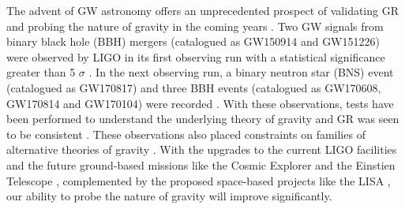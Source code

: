      


The advent of GW astronomy offers an unprecedented prospect of validating GR and probing the nature of gravity in the coming years \cite{kipGWGR}. Two GW signals from binary black hole (BBH) mergers (catalogued as GW150914 and GW151226) were observed by LIGO in its first observing run with a statistical significance greater than 5 $\sigma$ \cite{TheLIGOScientific:2016pea}. In the next observing run, a binary neutron star (BNS) event (catalogued as GW170817) and three BBH events (catalogued as GW170608, GW170814 and GW170104) were recorded \cite{GW170608, GW170814,GW170104, GW170817}. With these observations, tests have been performed to understand the underlying theory of gravity and GR was seen to be consistent \cite{TheLIGOScientific:2016src}. These observations also placed constraints on families of alternative theories of gravity  \cite{Yunes:2016jcc,TheLIGOScientific:2016src,2016arXiv160308955Y}. With the upgrades to the current LIGO facilities \cite{2015PhRvD..91f2005M} and the future ground-based missions like the Cosmic Explorer \cite{Evans:2016dc} and the Einstien Telescope \cite{0264-9381-28-9-094013}, complemented by the proposed space-based projects like the LISA \cite{LISA}, our ability to probe the nature of gravity will improve significantly. 


